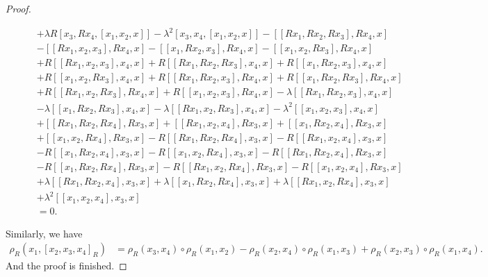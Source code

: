 \documentclass[12pt]{amsart}
\theoremstyle{definition}
\begin{document}
\begin{proof}
\begin{small}
\begin{align*}
\quad\quad&+\lambda R[x_3, Rx_4, [x_1, x_2, x]]-\lambda^2[x_3, x_4, [x_1, x_2, x]] -[[Rx_1,Rx_2,Rx_3], Rx_4, x]\\
\quad\quad &-[[Rx_1,x_2,x_3], Rx_4, x]-[[x_1,Rx_2,x_3], Rx_4, x]-[[x_1,x_2,Rx_3], Rx_4, x] \\
\quad\quad &+R[[Rx_1,x_2,x_3], x_4, x]+R[[Rx_1,Rx_2,Rx_3], x_4, x]+R[[x_1,Rx_2,x_3], x_4, x]\\
\quad\quad &+R[[x_1,x_2,Rx_3], x_4, x]+R[[Rx_1, Rx_2, x_3], Rx_4, x] +R[[x_1, Rx_2, Rx_3], Rx_4, x]\\
\quad\quad &+R[[Rx_1, x_2, Rx_3], Rx_4, x]+R[[x_1, x_2, x_3], Rx_4, x]-\lambda [[Rx_1, Rx_2, x_3], x_4, x]\\
\quad\quad &- \lambda[[x_1, Rx_2, Rx_3], x_4, x] - \lambda[[Rx_1, x_2, Rx_3], x_4, x]-\lambda^2 [[x_1, x_2, x_3], x_4, x]\\
\quad\quad &+[[Rx_1,Rx_2,Rx_4], Rx_3, x]+[[Rx_1,x_2,x_4], Rx_3, x]+[[x_1,Rx_2,x_4], Rx_3, x]\\
\quad\quad &+[[x_1,x_2,Rx_4], Rx_3, x] -R[[Rx_1,Rx_2,Rx_4], x_3, x]-R[[Rx_1,x_2,x_4], x_3, x]\\
\quad\quad &-R[[x_1,Rx_2,x_4], x_3, x]-R[[x_1,x_2,Rx_4], x_3, x]-R[[Rx_1, Rx_2, x_4], Rx_3, x] \\
\quad\quad &-R[[x_1, Rx_2, Rx_4], Rx_3, x]-R[[Rx_1, x_2, Rx_4], Rx_3, x]-R[[x_1, x_2, x_4], Rx_3, x]\\
\quad\quad &+\lambda[[Rx_1, Rx_2, x_4], x_3, x]+ \lambda[[x_1, Rx_2, Rx_4], x_3, x] + \lambda[[Rx_1, x_2, Rx_4], x_3, x]\\
\quad\quad &+\lambda^2 [[x_1, x_2, x_4], x_3, x]\\
&=0.
\end{align*}
\end{small}
Similarly, we have
\begin{align*}
\rho_R(x_1, [x_2, x_3, x_4]_R)&=\rho_R(x_3, x_4)\circ \rho_R(x_1, x_2)-\rho_R(x_2, x_4)\circ \rho_R(x_1, x_3)+\rho_R(x_2, x_3)\circ \rho_R(x_1, x_4).
\end{align*}
And the proof is finished.
\end{proof}
\end{document}
